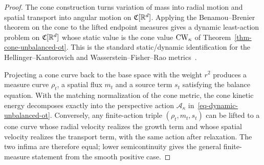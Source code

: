 \begin{proof}
	The cone construction turns variation of mass into radial motion and spatial transport into angular motion on $\mathfrak C[\mathbb{R}^d]$. Applying the Benamou--Brenier theorem on the cone to the lifted endpoint measures gives a dynamic least-action problem on $\mathfrak C[\mathbb{R}^d]$ whose static value is the cone value $\operatorname{CW}_\kappa$ of Theorem~\ref{thm-cone-unbalanced-ot}. This is the standard static/dynamic identification for the Hellinger--Kantorovich and Wasserstein--Fisher--Rao metrics~\cite{LieroMielkeSavareShort,LieroMielkeSavareLong,2017-chizat-focm,2015-chizat-unbalanced}.

	Projecting a cone curve back to the base space with the weight $r^2$ produces a measure curve $\rho_t$, a spatial flux $m_t$ and a source term $s_t$ satisfying the balance equation. With the matching normalization of the cone metric, the cone kinetic energy decomposes exactly into the perspective action $\mathcal A_\kappa$ in~\eqref{eq-dynamic-unbalanced-ot}. Conversely, any finite-action triple $(\rho_t,m_t,s_t)$ can be lifted to a cone curve whose radial velocity realizes the growth term and whose spatial velocity realizes the transport term, with the same action after relaxation. The two infima are therefore equal; lower semicontinuity gives the general finite-measure statement from the smooth positive case.
\end{proof}

